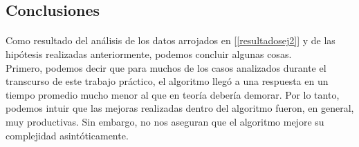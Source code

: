 \subsection{Conclusiones}

\paragraph{}
Como resultado del análisis de los datos arrojados en [\ref{resultadosej2}] y de las hipótesis realizadas anteriormente, podemos concluir algunas cosas.\\
Primero, podemos decir que para muchos de los casos analizados durante el transcurso de este trabajo práctico, el algoritmo llegó a una respuesta en un tiempo promedio mucho menor al que en teoría debería demorar. Por lo tanto, podemos intuir que las mejoras realizadas dentro del algoritmo fueron, en general, muy productivas. Sin embargo, no nos aseguran que el algoritmo mejore su complejidad asintóticamente.

\paragraph{}
